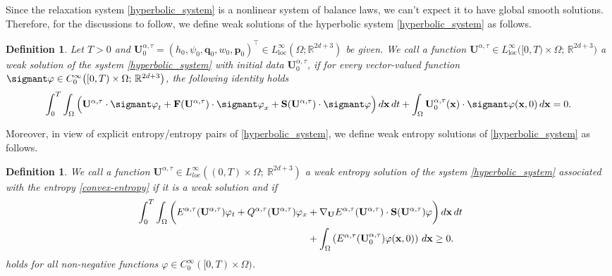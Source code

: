 \documentclass[11pt]{article}
\numberwithin{equation}{section}
\newtheorem{counter example}[theorem]{Counter Example}
\newtheorem{definition}[theorem] {Definition}
\def\bm \sigmant#1{\mathchoice
	{\XXint\displaystyle\textstyle{#1}}%
	{\XXint\textstyle\scriptstyle{#1}}%
	{\XXint\scriptstyle\scriptscriptstyle{#1}}%
	{\XXint\scriptscriptstyle\scriptscriptstyle{#1}}%
	\!\int}
\def\XXint#1#2#3{{\setbox0=\hbox{$#1{#2#3}{\int}$}
		\vcenter{\hbox{$#2#3$}}\kern-.50\wd0}}
\numberwithin{equation}{section}
\numberwithin{equation}{section}
\newcommand{\rel}{^{\alpha, \tau}}
\begin{document}
Since the relaxation system \eqref{hyperbolic_system} is a nonlinear system of balance laws, we can't expect it to have global smooth solutions. Therefore, for the discussions to follow, we define weak solutions of the hyperbolic system \eqref{hyperbolic_system} as follows.
\begin{definition}\label{weak_soln}
Let $T>0$ and $\mathbf{U}\rel_0=\left(h_0, \psi_0, \mathbf{q}_0, w_0, \mathbf{p}_0\right)^\top\in L^\infty_{\mathrm{loc}}(\Omega;\mathbb{R}^{2d+3})$ be given.  We call a function $\mathbf{U}\rel \in L^\infty_{\mathrm{loc}}\big([0,T)\times\Omega;\,\mathbb{R}^{2d+3}\big)$ a weak solution of the system \eqref{hyperbolic_system} with initial data 
$\mathbf{U}\rel_0$, if for every vector-valued function ${\bm \varphi} \in C_0^\infty\big([0,T)\times\Omega;\,\mathbb{R}^{2d+3}\big)$, the following identity holds
\begin{equation*}
    \int_{0}^{T}\int_{\Omega} 
    \Big( \mathbf{U}\rel\cdot {\bm \varphi}_t
          + \mathbf{F}(\mathbf{U}\rel)\cdot {\bm \varphi}_x
          +\mathbf{S}(\mathbf{U}\rel)\cdot {\bm \varphi} \Big)\,d\mathbf{x}\,dt
    + \int_{\Omega} \mathbf{U}\rel_0(\mathbf{x})\cdot {\bm \varphi}(\mathbf{x}, 0)\,d\mathbf{x} = 0.
\end{equation*}
\end{definition}
Moreover, in view of explicit entropy/entropy pairs of \eqref{hyperbolic_system}, we define weak entropy solutions of \eqref{hyperbolic_system} as follows.
\begin{definition}\label{entropy_soln}
We call a function $\mathbf{U}\rel\in {L}_{loc}^{\infty}((0,T)\times \Omega; ~\mathbb{R}^{2d+3} )$ a weak  entropy solution of the system \eqref{hyperbolic_system} associated with the entropy \eqref{convex-entropy} if it is a weak solution and if 
\begin{equation}
\begin{aligned}\hspace*{-0.56cm}
    \int_{0}^{T}\int_{\Omega} \bigg(E^{\alpha, \tau}(\mathbf{U}\rel)\varphi_t+Q^{\alpha, \tau}(\mathbf{U}\rel)\varphi_x&+\nabla_{\mathbf{U}}E^{\alpha, \tau}(\mathbf{U}\rel)\cdot \mathbf{S(U\rel)}\varphi\bigg) \, d\mathbf{x}\, dt\\
    &+\int_{\Omega} \left(E^{\alpha, \tau}(\mathbf{U}\rel_0)\varphi(\mathbf{x}, 0)\right)\, d\mathbf{x}\geq 0. 
\end{aligned}
\end{equation}
holds for all non-negative functions $\varphi \in C^\infty_0([0,T)\times \Omega)$.
\end{definition}
\end{document}
